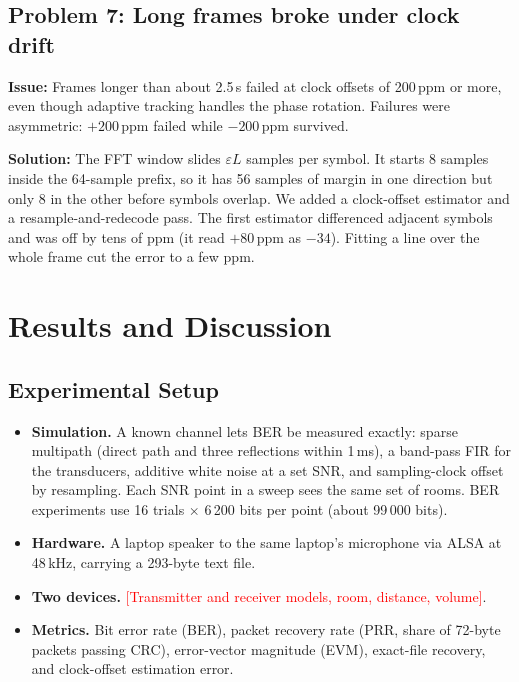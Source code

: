 \documentclass[11pt,a4paper]{report}
\newcommand{\fillin}[1]{\textcolor{red}{[#1]}}
\begin{document}
\section{Problem 7: Long frames broke under clock drift}
\textbf{Issue:} Frames longer than about 2.5\,s failed at clock offsets of 200\,ppm
or more, even though adaptive tracking handles the phase rotation. Failures were
asymmetric: $+200$\,ppm failed while $-200$\,ppm survived.

\textbf{Solution:} The FFT window slides $\varepsilon L$ samples per symbol. It
starts 8 samples inside the 64-sample prefix, so it has 56 samples of margin in one
direction but only 8 in the other before symbols overlap. We added a clock-offset
estimator and a resample-and-redecode pass. The first estimator differenced
adjacent symbols and was off by tens of ppm (it read $+80$\,ppm as $-34$). Fitting a
line over the whole frame cut the error to a few ppm.

\chapter{Results and Discussion}

\section{Experimental Setup}
\begin{itemize}
    \item \textbf{Simulation.} A known channel lets BER be measured exactly: sparse
    multipath (direct path and three reflections within 1\,ms), a band-pass FIR for the
    transducers, additive white noise at a set SNR, and sampling-clock offset by
    resampling. Each SNR point in a sweep sees the same set of rooms. BER experiments
    use 16 trials $\times$ 6\,200 bits per point (about 99\,000 bits).
    \item \textbf{Hardware.} A laptop speaker to the same laptop's microphone via ALSA at
    48\,kHz, carrying a 293-byte text file.
    \item \textbf{Two devices.} \fillin{Transmitter and receiver models, room, distance,
    volume}.
    \item \textbf{Metrics.} Bit error rate (BER), packet recovery rate (PRR, share of
    72-byte packets passing CRC), error-vector magnitude (EVM), exact-file recovery,
    and clock-offset estimation error.
\end{itemize}
\end{document}
